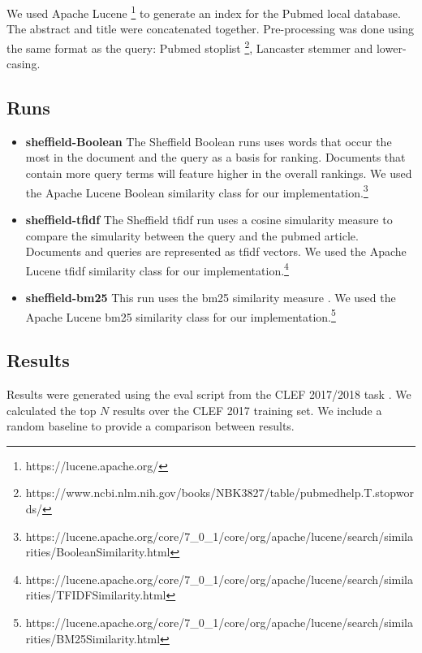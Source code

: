 We used Apache Lucene \footnote{https://lucene.apache.org/} to generate an index for the Pubmed local database. The abstract and title were concatenated together. Pre-processing was done using the same format as the query: Pubmed stoplist \footnote{https://www.ncbi.nlm.nih.gov/books/NBK3827/table/pubmedhelp.T.stopwords/}, Lancaster stemmer and lower-casing. 


\subsection{Runs}

\begin{itemize}
\item \textbf{sheffield-Boolean}  
The Sheffield Boolean runs uses words that occur the most in the document and the query as a basis for ranking. Documents that contain more query terms will feature higher in the overall rankings. We used the Apache Lucene Boolean similarity class for our implementation.\footnote{https://lucene.apache.org/core/7\_0\_1/core/org/apache/lucene/search/similarities/BooleanSimilarity.html}

\item \textbf{sheffield-tfidf} The Sheffield tfidf run uses a cosine simularity measure to compare the simularity between the query and the pubmed article. Documents and queries are represented as tfidf vectors. We used the Apache Lucene tfidf similarity class for our implementation.\footnote{https://lucene.apache.org/core/7\_0\_1/core/org/apache/lucene/search/similarities/TFIDFSimilarity.html}

\item \textbf{sheffield-bm25} This run uses the bm25 similarity measure \cite{Robertson96okapiat}. We used the Apache Lucene bm25 similarity class for our implementation.\footnote{https://lucene.apache.org/core/7\_0\_1/core/org/apache/lucene/search/similarities/BM25Similarity.html}

\end{itemize}

\subsection{Results}

Results were generated using the eval script from the CLEF 2017/2018 task \cite{Kanoulas12017}. We calculated the top $N$ results over the CLEF 2017 training set. We include a random baseline  to provide a comparison between results.


